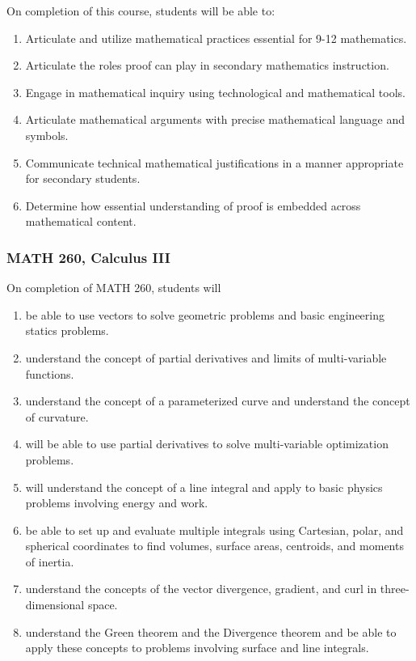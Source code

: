\documentclass[11pt]{article}
\newenvironment{alphalist}{
  \begin{enumerate}[(1)]
    \addtolength{\itemsep}{-1.0\itemsep}}
  {\end{enumerate}}
\begin{document}
On completion of this course, students will be able to:
\begin{alphalist}
\item Articulate and utilize mathematical practices essential for 9-12 mathematics.  
\item Articulate the roles proof can play in secondary mathematics instruction.
\item Engage in mathematical inquiry using technological and mathematical tools.
\item Articulate mathematical arguments with precise mathematical language and symbols.
\item Communicate technical mathematical justifications in a manner appropriate for secondary students.
\item Determine how essential understanding of proof is embedded across mathematical content.
\end{alphalist}

\subsubsection*{MATH 260, Calculus III}


On completion of MATH 260, students will 
\begin{alphalist} 
    \item be able to use vectors to solve geometric problems and basic engineering statics problems.
    \item understand the concept of partial derivatives and limits of multi-variable functions.
    \item understand the concept of a parameterized curve and understand the concept of curvature.
    \item will be able to use partial derivatives to solve multi-variable optimization problems.
    \item will understand the concept of a line integral and apply to basic physics problems involving energy and work.
    \item be able to set up and evaluate multiple integrals using Cartesian, polar, and spherical coordinates to find volumes, surface areas, centroids, and moments of inertia.
    \item understand the concepts of the vector divergence, gradient, and curl in three-dimensional space.
    \item understand the Green theorem and the Divergence theorem and be able to apply these concepts to problems involving surface and line integrals.
\end{alphalist}
\end{document}
